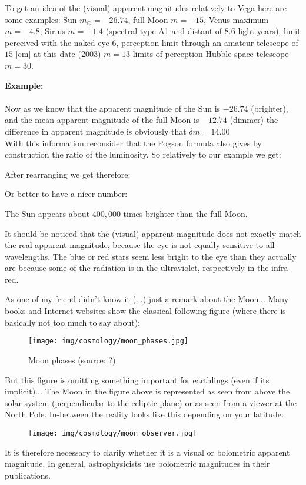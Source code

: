 	To get an idea of the (visual) apparent magnitudes relatively to Vega here are some examples: Sun $m_{\odot}=-26.74$, full Moon $m=-15$, Venus maximum $m=-4.8$, Sirius $m=-1.4$ (spectral type A1 and distant of $8.6$ light years), limit perceived with the naked eye $6$, perception limit through an amateur telescope of $15$ [cm] at this date (2003) $m=13$ limits of perception Hubble space telescope $m=30$.
	\begin{tcolorbox}[colframe=black,colback=white,sharp corners]
	\textbf{{\Large {}}Example:}\\\\
	Now as we know that the apparent magnitude of the Sun is $-26.74$ (brighter), and the mean apparent magnitude of the full Moon is $-12.74$ (dimmer) the difference in apparent magnitude is obviously that $\delta m=14.00$\\

	With this information reconsider that the Pogson formula also gives by construction the ratio of the luminosity. So relatively to our example we get:
	
	After rearranging we get therefore:
	
	Or better to have a nicer number:
	
	The Sun appears about $400,000$ times brighter than the full Moon.
	\end{tcolorbox}
	It should be noticed that the (visual) apparent magnitude does not exactly match the real apparent magnitude, because the eye is not equally sensitive to all wavelengths. The blue or red stars seem less bright to the eye than they actually are because some of the radiation is in the ultraviolet, respectively in the infra-red.
	
	As one of my friend didn't know it (...) just a remark about the Moon... Many books and Internet websites show the classical following figure (where there is basically not too much to say about)\label{new moon}:
	\begin{figure}[H]
		\centering
		\texttt{[image: img/cosmology/moon\_phases.jpg]}
		\caption[Moon phases]{Moon phases (source: ?)}
	\end{figure}
	But this figure is omitting something important for earthlings (even if its implicit)... The Moon in the figure above is represented as seen from above the solar system (perpendicular to the ecliptic plane) or as seen from a viewer at the North Pole. In-between the reality looks like this depending on your latitude:
	\begin{figure}[H]
		\centering
		\texttt{[image: img/cosmology/moon\_observer.jpg]}
	\end{figure}
	It is therefore necessary to clarify whether it is a  visual or bolometric apparent magnitude. In general, astrophysicists use bolometric magnitudes in their publications.
	
